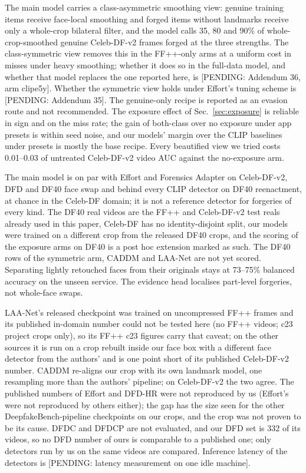 The main model carries a class-asymmetric smoothing view: genuine training items receive face-local smoothing and
forged items without landmarks receive only a whole-crop bilateral filter, and the model calls 35, 80 and 90\% of
whole-crop-smoothed genuine Celeb-DF-v2 frames forged at the three strengths. The class-symmetric view removes this in
the FF++-only arms at a uniform cost in misses under heavy smoothing; whether it does so in the full-data model, and
whether that model replaces the one reported here, is [PENDING: Addendum 36, arm clipe5y]. Whether the symmetric view
holds under Effort's tuning scheme is [PENDING: Addendum 35]. The genuine-only recipe is reported as an evasion route
and not recommended. The exposure effect of Sec.~\ref{sec:exposure} is reliable in sign and on the miss rate; the gain
of both-class over no exposure under app presets is within seed noise, and our models' margin over the CLIP baselines
under presets is mostly the base recipe. Every beautified view we tried costs 0.01--0.03 of untreated Celeb-DF-v2 video
AUC against the no-exposure arm.

The main model is on par with Effort and Forensics Adapter on Celeb-DF-v2, DFD and DF40 face swap and behind every CLIP
detector on DF40 reenactment, at chance in the Celeb-DF domain; it is not a reference detector for forgeries of every
kind. The DF40 real videos are the FF++ and Celeb-DF-v2 test reals already used in this paper, Celeb-DF has no
identity-disjoint split, our models were trained on a different crop from the released DF40 crops, and the scoring of
the exposure arms on DF40 is a post hoc extension marked as such. The DF40 rows of the symmetric arm, CADDM and LAA-Net
are not yet scored. Separating lightly retouched faces from their originals stays at 73--75\% balanced accuracy on the
unseen service. The evidence head localises part-level forgeries, not whole-face swaps.

LAA-Net's released checkpoint was trained on uncompressed FF++ frames and its published in-domain number could not be
tested here (no FF++ videos; c23 project crops only), so its FF++ c23 figures carry that caveat; on the other sources
it is run on a crop rebuilt inside our face box with a different face detector from the authors' and is one point short
of its published Celeb-DF-v2 number. CADDM re-aligns our crop with its own landmark model, one resampling more than the
authors' pipeline; on Celeb-DF-v2 the two agree. The published numbers of Effort and DFD-HR were not reproduced by us
(Effort's were not reproduced by others either); the gap has the size seen for the other DeepfakeBench-pipeline
checkpoints on our crops, and the crop was not proven to be its cause. DFDC and DFDCP are not evaluated, and our DFD set is 332 of its
videos, so no DFD number of ours is comparable to a published one; only detectors run by us on the same videos are
compared. Inference latency of the detectors is [PENDING: latency measurement on one idle machine].
